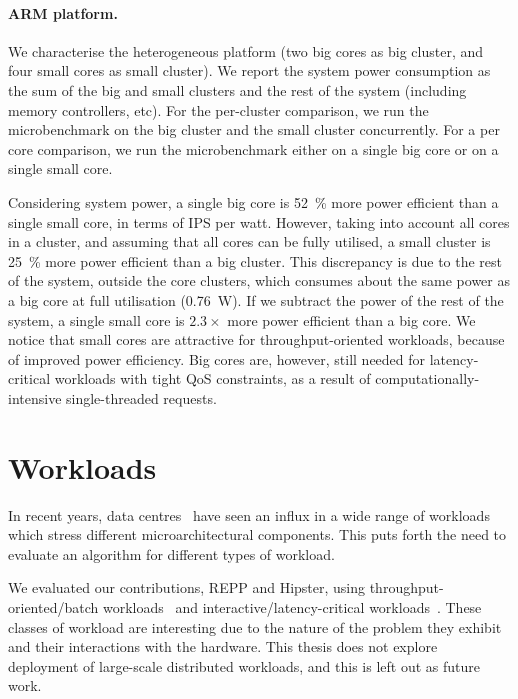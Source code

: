 \paragraph*{ARM platform.}   We characterise the heterogeneous platform (two big cores as
big cluster, and four small cores as small cluster). We report the system power
consumption as the sum of the big and small clusters and the rest of the system (including
memory controllers, etc).  For the per-cluster comparison, we run the microbenchmark on
the big cluster and the small cluster concurrently. For a per core comparison, we run the
microbenchmark either on a single big core or on a single small core.

Considering system power, a single big core is \SI{52}{\percent}  more power efficient
than a single small core, in terms of IPS per watt. However, taking into account all cores
in a cluster, and assuming that all cores can be fully utilised, a small cluster is
\SI{25}{\percent} more power efficient than a big cluster.  This discrepancy is due to the
rest of the system, outside the core clusters, which consumes about the same power as a
big core at full utilisation (\SI{0.76}{\watt}). If we subtract the power of the rest of
the system, a single small core is $2.3\times$ more power efficient than a big core.  We
notice that small cores are attractive for throughput-oriented workloads, because of
improved power efficiency. Big cores are, however, still needed for latency-critical
workloads with tight QoS constraints, as a result of computationally-intensive
single-threaded requests.



\section{Workloads} 
\label{section: workloads}

In recent years, data centres~\citep{montblanc, Barroso2013TheEdition,
Petrucci2015Octopus-Man:Computers,Meisner2011PowerServices, Lo2015Heracles, montblanc2,
Kasture2015Rubik, montblancbull, Lo2014TowardsWorkloads} have seen an influx in a wide
range of workloads which stress different microarchitectural components.  This puts forth
the need to evaluate an algorithm for different types of workload.

We evaluated our contributions, REPP and Hipster, using throughput-oriented/batch
workloads~\citep{Mars2013Whare-map,Yang2013Bubble-flux} and interactive/latency-critical
workloads~\citep{Barroso2013TheEdition,
Petrucci2015Octopus-Man:Computers,Meisner2011PowerServices, Lo2015Heracles,
Lo2014TowardsWorkloads,Kasture2015Rubik}. These classes of workload are interesting due to
the nature of the problem they exhibit and their interactions with the hardware.  This
thesis does not explore deployment of large-scale distributed workloads, and this is left
out as future work. 


